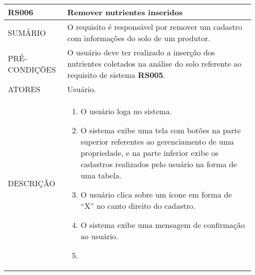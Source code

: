 \begin{longtable}[c]{@{}|p{4cm}|p{9cm}|@{}}
\hline
\begin{minipage}[t]{0.47\columnwidth}
\textbf{RS006}
\end{minipage} & \begin{minipage}[t]{0.47\columnwidth}
Remover nutrientes inseridos
\end{minipage}
\\\hline
\begin{minipage}[t]{0.47\columnwidth}
SUMÁRIO
\end{minipage} & \begin{minipage}[t]{0.47\columnwidth}
O requisito é responsável por remover um cadastro com informações do
solo de um produtor.
\end{minipage}
\\\hline
\begin{minipage}[t]{0.47\columnwidth}
PRÉ-CONDIÇÕES
\end{minipage} & \begin{minipage}[t]{0.47\columnwidth}
O usuário deve ter realizado a inserção dos nutrientes coletados na
análise do solo referente ao requisito de sistema \textbf{RS005}.
\end{minipage}
\\\hline
\begin{minipage}[t]{0.47\columnwidth}
ATORES
\end{minipage} & \begin{minipage}[t]{0.47\columnwidth}
Usuário.
\end{minipage}
\\\hline
\begin{minipage}[t]{0.47\columnwidth}
DESCRIÇÃO
\end{minipage} & \begin{minipage}[t]{0.47\columnwidth}
\begin{enumerate}
\def\labelenumi{\arabic{enumi}.}
\itemsep1pt\parskip0pt\parsep0pt
\item
  O usuário loga no sistema.
\item
  O sistema exibe uma tela com botões na parte superior referentes ao
  gerenciamento de uma propriedade, e na parte inferior exibe os
  cadastros realizados pelo usuário na forma de uma tabela.
\item
  O usuário clica sobre um ícone em forma de ``X'' no canto direito do
  cadastro.
\item
  O sistema exibe uma mensagem de confirmação ao usuário.
\item

\end{enumerate}
\end{minipage}
\end{longtable}
